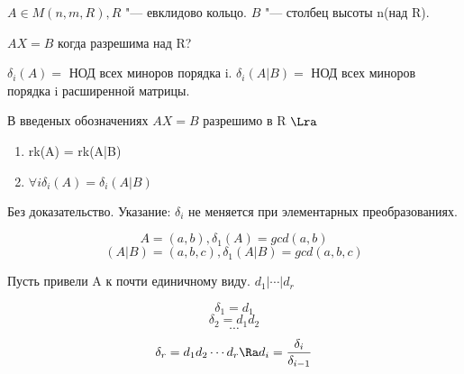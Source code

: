 $A \in M(n, m, R), R$ "--- евклидово кольцо.
$B$ "--- столбец высоты n(над R).

$AX = B$ когда разрешима над R?

$\delta_{i}(A) = $ НОД всех миноров порядка i.
$\delta_i(A|B) =$ НОД всех миноров порядка i расширенной матрицы.
\begin{theorem}{}
В введеных обозначениях $AX = B$ разрешимо в R $\Lra$ 
\begin{enumerate}
\item rk(A) = rk(A|B)
\item $\forall i \delta_i(A) = \delta_i(A|B)$
\end{enumerate}
\end{theorem}

Без доказательство. Указание: $\delta_i$ не меняется при элементарных преобразованиях.

$$A = (a, b), \delta_1(A) = gcd(a, b)$$
$$(A|B) = (a, b, c), \delta_1(A|B) = gcd(a, b, c)$$ 

Пусть привели A к почти единичному виду. $d_1|\cdots|d_r$

$$\delta_1 = d_1$$
$$\delta_2 = d_1d_2$$
$$\cdots$$
$$\delta_r = d_1d_2 \cdots d_r \Ra d_i = \frac{\delta_i}{\delta_{i - 1}}$$